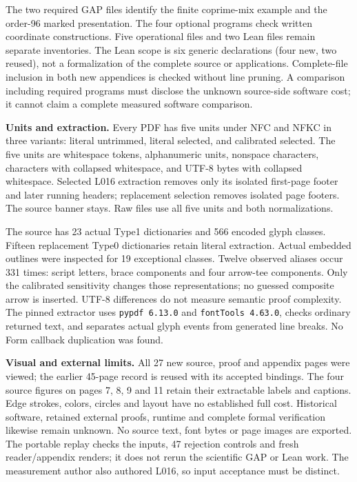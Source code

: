 \documentclass[a4paper,11pt]{article}
\begin{document}
The two required GAP files identify the finite coprime-mix example and the
order-96 marked presentation. The four optional programs check written
coordinate constructions. Five operational files and two Lean files remain
separate inventories. The Lean scope is six generic declarations (four new,
two reused), not a formalization of the complete source or applications.
Complete-file inclusion in both new appendices is checked without line pruning.
A comparison including required programs must disclose the unknown source-side
software cost; it cannot claim a complete measured software comparison.

\textbf{Units and extraction.} Every PDF has five units under NFC and NFKC in
three variants: literal untrimmed, literal selected, and calibrated selected.
The five units are whitespace tokens, alphanumeric units, nonspace characters,
characters with collapsed whitespace, and UTF-8 bytes with collapsed whitespace.
Selected L016 extraction removes only its isolated first-page footer and later
running headers; replacement selection removes isolated page footers. The source
banner stays. Raw files use all five units and both normalizations.

The source has 23 actual Type1 dictionaries and 566 encoded glyph classes.
Fifteen replacement Type0 dictionaries retain literal extraction. Actual embedded
outlines were inspected for 19 exceptional classes. Twelve observed aliases occur
331 times: script letters, brace components and four arrow-tee components. Only
the calibrated sensitivity changes those representations; no guessed composite
arrow is inserted. UTF-8 differences do not measure semantic proof complexity.
The pinned extractor uses \texttt{pypdf 6.13.0} and \texttt{fontTools 4.63.0},
checks ordinary returned text, and separates actual glyph events from generated
line breaks. No Form callback duplication was found.

\textbf{Visual and external limits.} All 27 new source, proof and appendix pages
were viewed; the earlier 45-page record is reused with its accepted bindings.
The four source figures on pages 7, 8, 9 and 11 retain their extractable labels
and captions. Edge strokes, colors, circles and layout have no established full
cost. Historical software, retained external proofs, runtime and complete formal
verification likewise remain unknown. No source text, font bytes or page images
are exported. The portable replay checks the inputs, 47 rejection controls and
fresh reader/appendix renders; it does not rerun the scientific GAP or Lean work.
The measurement author also authored L016, so input acceptance must be distinct.
\end{document}
